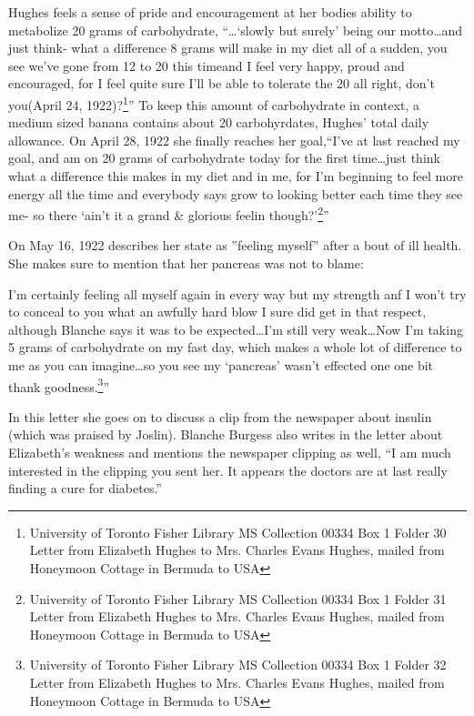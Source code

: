 \documentclass[12pt]{article}
\begin{document}
Hughes feels a sense of pride and encouragement at her bodies ability to metabolize 20 grams of carbohydrate,
``\dots `slowly but surely' being our motto\dots and just think- what a difference 8 grams will make in my diet all of a sudden, you see we've gone from 12 to 20 this timeand I feel very happy, proud and encouraged, for I feel quite sure I'll be able to tolerate the 20 all right, don't you(April 24, 1922)?\footnote{University of Toronto Fisher Library MS Collection 00334 Box 1 Folder 30 Letter from Elizabeth Hughes to Mrs. Charles Evans Hughes, mailed from Honeymoon Cottage in Bermuda to USA}'' To keep this amount of carbohydrate in context, a medium sized banana contains about 20 carbohyrdates, Hughes' total daily allowance. On April 28, 1922
she finally reaches her goal,``I've at last reached my goal, and am on 20 grams of carbohydrate today for the first time\dots just think what a difference this makes in my diet and in me, for I'm beginning to feel more energy all the time and everybody says grow to looking better each time they see me- so there `ain't it a grand \& glorious feelin though?'\footnote{University of Toronto Fisher Library MS Collection 00334 Box 1 Folder 31 Letter from Elizabeth Hughes to Mrs. Charles Evans Hughes, mailed from Honeymoon Cottage in Bermuda to USA}''

On May 16, 1922 describes her state as ''feeling myself'' after a bout of ill health. She makes sure to mention that her pancreas was not to blame: 
\begin{singlespace}
I'm certainly feeling all myself again in every way but my strength anf I won't try to conceal to you what an awfully hard blow I sure did get in that respect, although Blanche says it was to be expected\dots I'm still very weak\dots Now I'm taking 5 grams of carbohydrate on my fast day, which makes a whole lot of difference to me as you can imagine\dots so you see my `pancreas' wasn't effected one one bit thank goodness.\footnote{University of Toronto Fisher Library MS Collection 00334 Box 1 Folder 32 Letter from Elizabeth Hughes to Mrs. Charles Evans Hughes, mailed from Honeymoon Cottage in Bermuda to USA}''
\end{singlespace}
In this letter she goes on to discuss a clip from the newspaper about insulin (which was praised by Joslin). Blanche Burgess also writes in the letter about Elizabeth's weakness and mentions the newspaper clipping as well, ``I am much interested in the clipping you sent her. It appears the doctors are at last really finding a cure for diabetes.'' 
\end{document}

